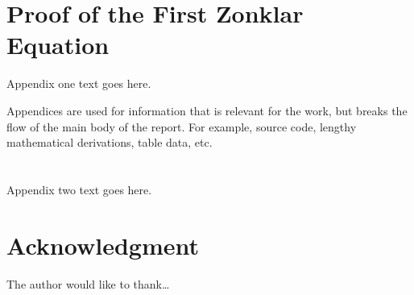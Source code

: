 \documentclass[peerreviewca]{IEEEtran}
\begin{document}
%

\appendices
\section{Proof of the First Zonklar Equation}
Appendix one text goes here.

Appendices are used for information that is relevant for the work, but breaks
the flow of the main body of the report. For example, source code, lengthy
mathematical derivations, table data, etc.

\section{}
Appendix two text goes here.


\section*{Acknowledgment}


The author would like to thank\ldots

% 
% 
%
\end{document}
